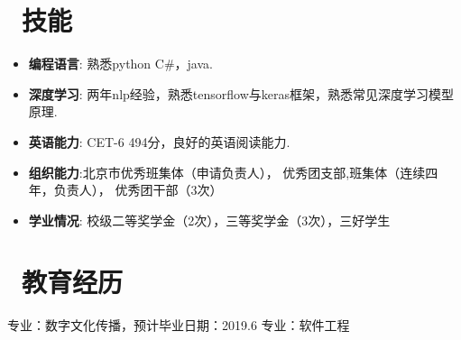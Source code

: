 \documentclass{resume}
\begin{document}
\section{\faCogs\ 技能}
\begin{onehalfspacing}
\begin{itemize}[parsep=0.25ex]
  \item \textbf{编程语言}: 熟悉python C\#，java.
  \item \textbf{深度学习}:
    两年nlp经验，熟悉tensorflow与keras框架，熟悉常见深度学习模型原理.

  \item \textbf{英语能力}: CET-6 494分，良好的英语阅读能力.
   \item \textbf{组织能力}:北京市优秀班集体（申请负责人），
   优秀团支部,班集体（连续四年，负责人）， 优秀团干部（3次）			
    \item \textbf{学业情况}: 校级二等奖学金（2次），三等奖学金（3次），三好学生

\end{itemize}
\end{onehalfspacing}
\vspace{-1ex}
\section{\faGraduationCap\ 教育经历}
专业：数字文化传播，预计毕业日期：2019.6
专业：软件工程


%
%
\end{document}
